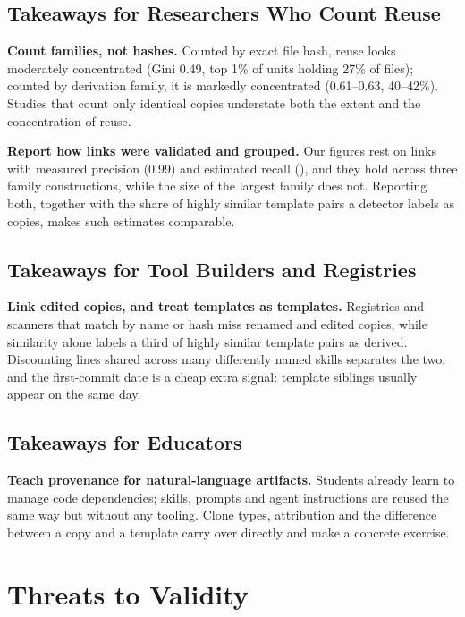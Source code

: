 \documentclass[sigconf,screen]{acmart}
\begin{document}
\subsection{Takeaways for Researchers Who Count Reuse}
\textbf{Count families, not hashes.} Counted by exact file hash, reuse looks moderately concentrated (Gini 0.49, top 1\% of units holding 27\% of files); counted by derivation family, it is markedly concentrated (0.61--0.63, 40--42\%). Studies that count only identical copies understate both the extent and the concentration of reuse.
 
\textbf{Report how links were validated and grouped.} Our figures rest on links with measured precision (0.99) and estimated recall (\ResRCRecall{}), and they hold across three family constructions, while the size of the largest family does not. Reporting both, together with the share of highly similar template pairs a detector labels as copies, makes such estimates comparable.
 
\subsection{Takeaways for Tool Builders and Registries}
\textbf{Link edited copies, and treat templates as templates.} Registries and scanners that match by name or hash miss renamed and edited copies, while similarity alone labels a third of highly similar template pairs as derived. Discounting lines shared across many differently named skills separates the two, and the first-commit date is a cheap extra signal: template siblings usually appear on the same day.
 
\subsection{Takeaways for Educators}
\textbf{Teach provenance for natural-language artifacts.} Students already learn to manage code dependencies; skills, prompts and agent instructions are reused the same way but without any tooling. Clone types, attribution and the difference between a copy and a template carry over directly and make a concrete exercise.


\section{Threats to Validity}
\label{sec:threats}
\end{document}
